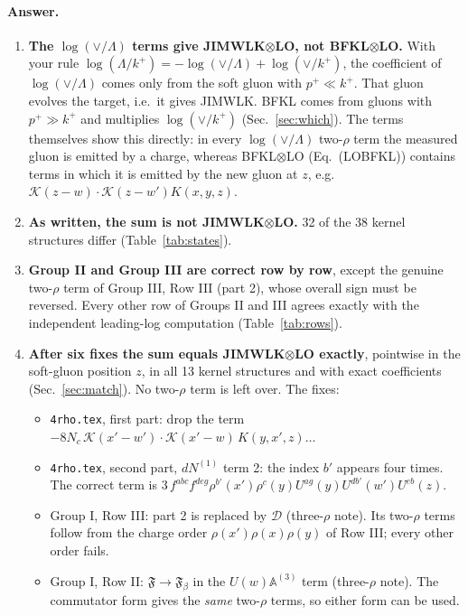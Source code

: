 \documentclass[10pt]{article}
\numberwithin{equation}{section}
\newcommand{\KK}{\mathcal K}
\begin{document}
\paragraph{Answer.}
\begin{enumerate}
\item \textbf{The $\log(\vee/\Lambda)$ terms give JIMWLK$\otimes$LO, not BFKL$\otimes$LO.} With your rule $\log(\Lambda/k^+)=-\log(\vee/\Lambda)+\log(\vee/k^+)$, the coefficient of $\log(\vee/\Lambda)$ comes only from the soft gluon with $p^+\ll k^+$. That gluon evolves the target, i.e.\ it gives JIMWLK. BFKL comes from gluons with $p^+\gg k^+$ and multiplies $\log(\vee/k^+)$ (Sec.~\ref{sec:which}). The terms themselves show this directly: in every $\log(\vee/\Lambda)$ two-$\rho$ term the measured gluon is emitted by a charge, whereas BFKL$\otimes$LO (Eq.~(LOBFKL)) contains terms in which it is emitted by the new gluon at $z$, e.g.\ $\KK(z-w)\cdot\KK(z-w')K(x,y,z)$.
\item \textbf{As written, the sum is not JIMWLK$\otimes$LO.} 32 of the 38 kernel structures differ (Table~\ref{tab:states}).
\item \textbf{Group II and Group III are correct row by row}, except the genuine two-$\rho$ term of Group III, Row III (part 2), whose overall sign must be reversed. Every other row of Groups II and III agrees exactly with the independent leading-log computation (Table~\ref{tab:rows}).
\item \textbf{After six fixes the sum equals JIMWLK$\otimes$LO exactly}, pointwise in the soft-gluon position $z$, in all 13 kernel structures and with exact coefficients (Sec.~\ref{sec:match}). No two-$\rho$ term is left over. The fixes:
\begin{itemize}
\item[F1] \texttt{4rho.tex}, first part: drop the term $-8N_c\,\KK(x'-w')\cdot\KK(x'-w)\,K(y,x',z)\dots$
\item[F2] \texttt{4rho.tex}, second part, $dN^{(1)}$ term 2: the index $b'$ appears four times. The correct term is $3\,f^{abc}f^{deg}\rho^{b'}(x')\rho^c(y)U^{ag}(y)U^{db'}(w')U^{eb}(z)$.
\item[F3] Group I, Row III: part 2 is replaced by $\mathcal D$ (three-$\rho$ note). Its two-$\rho$ terms follow from the charge order $\rho(x')\rho(x)\rho(y)$ of Row III; every other order fails.
\item[F4] Group I, Row II: $\mathfrak F\to\mathfrak F_\beta$ in the $U(w)\mathbb A^{(3)}$ term (three-$\rho$ note). The commutator form gives the \emph{same} two-$\rho$ terms, so either form can be used.

\end{itemize}
\end{enumerate}
\end{document}
